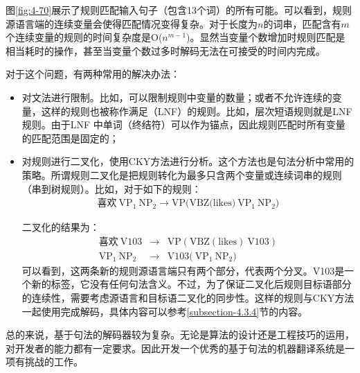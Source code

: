 \parinterval 图\ref{fig:4-70}展示了规则匹配输入句子（包含13个词）的所有可能。可以看到，规则源语言端的连续变量会使得匹配情况变得复杂。对于长度为$n$的词串，匹配含有$m$个连续变量的规则的时间复杂度是O($n^{m-1}$)。显然当变量个数增加时规则匹配是相当耗时的操作，甚至当变量个数过多时解码无法在可接受的时间内完成。

\parinterval 对于这个问题，有两种常用的解决办法：
\begin{itemize}
\vspace{0.5em}
\item 对文法进行限制。比如，可以限制规则中变量的数量；或者不允许连续的变量，这样的规则也被称作满足{\small{}}（LNF）的规则。比如，层次短语规则就是LNF规则。由于LNF 中单词（终结符）可以作为锚点，因此规则匹配时所有变量的匹配范围是固定的；
\vspace{0.5em}
\item 对规则进行二叉化，使用CKY方法进行分析。这个方法也是句法分析中常用的策略。所谓规则二叉化是把规则转化为最多只含两个变量或连续词串的规则（串到树规则）。比如，对于如下的规则：
\begin{eqnarray}
\textrm{喜欢}\ \textrm{VP}_1\ \textrm{NP}_2 \rightarrow \textrm{VP(VBZ(likes)}\ \textrm{VP}_1\ \textrm{NP}_2 ) \nonumber
\end{eqnarray}

\noindent 二叉化的结果为：
\begin{eqnarray}
\textrm{喜欢}\ \textrm{V103} &\rightarrow& \textrm{VP}(\textrm{VBZ}(\textrm{likes})\ \textrm{V103} ) \nonumber \\
\textrm{VP}_1\ \textrm{NP}_2 &\rightarrow& \textrm{V103(}\ \textrm{VP}_1\ \textrm{NP}_2 ) \nonumber
\end{eqnarray}
\noindent 可以看到，这两条新的规则源语言端只有两个部分，代表两个分叉。V103是一个新的标签，它没有任何句法含义。不过，为了保证二叉化后规则目标语部分的连续性，需要考虑源语言和目标语二叉化的同步性\cite{zhang2006synchronous,Tong2009Better}。这样的规则与CKY方法一起使用完成解码，具体内容可以参考\ref{subsection-4.3.4}节的内容。
\vspace{0.5em}
\end{itemize}

\parinterval 总的来说，基于句法的解码器较为复杂。无论是算法的设计还是工程技巧的运用，对开发者的能力都有一定要求。因此开发一个优秀的基于句法的机器翻译系统是一项有挑战的工作。


